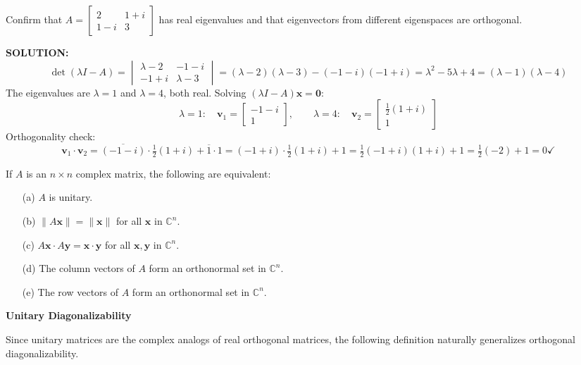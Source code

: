\documentclass{article}
\newcommand{\redheading}[1]{{\vspace{2mm}\noindent\Large\bfseries\color{red!55!black} #1\par}\vspace{2mm}}
\begin{document}
Confirm that
$A = \begin{bmatrix} 2 & 1+i \\ 1-i & 3 \end{bmatrix}$
has real eigenvalues and that eigenvectors from different eigenspaces are orthogonal.

\textbf{SOLUTION:}
\[
  \det(\lambda I - A) = \begin{vmatrix} \lambda-2 & -1-i \\ -1+i & \lambda-3 \end{vmatrix}
  = (\lambda-2)(\lambda-3)-(-1-i)(-1+i) = \lambda^2-5\lambda+4 = (\lambda-1)(\lambda-4)
\]
The eigenvalues are $\lambda=1$ and $\lambda=4$, both real. Solving $(\lambda I-A)\mathbf{x}=\mathbf{0}$:
\[
  \lambda=1:\quad \mathbf{v}_1 = \begin{bmatrix}-1-i\\1\end{bmatrix},
  \qquad
  \lambda=4:\quad \mathbf{v}_2 = \begin{bmatrix}\tfrac{1}{2}(1+i)\\1\end{bmatrix}
\]
Orthogonality check:
\[
  \mathbf{v}_1\cdot\mathbf{v}_2 = \overline{(-1-i)}\cdot\tfrac{1}{2}(1+i) + \overline{1}\cdot 1
  = (-1+i)\cdot\tfrac{1}{2}(1+i)+1 = \tfrac{1}{2}(-1+i)(1+i)+1 = \tfrac{1}{2}(-2)+1 = 0 \checkmark
\]

\begin{tcolorbox}[colback=red!4, colframe=red!60!black,
  title={\textbf{Theorem 7.5.3}}, boxrule=0.5mm, arc=3mm]
If $A$ is an $n\times n$ complex matrix, the following are equivalent:
\begin{enumerate}
  \item[(a)] $A$ is unitary.
  \item[(b)] $\|A\mathbf{x}\|=\|\mathbf{x}\|$ for all $\mathbf{x}$ in $\mathbb{C}^n$.
  \item[(c)] $A\mathbf{x}\cdot A\mathbf{y} = \mathbf{x}\cdot\mathbf{y}$ for all $\mathbf{x},\mathbf{y}$ in $\mathbb{C}^n$.
  \item[(d)] The column vectors of $A$ form an orthonormal set in $\mathbb{C}^n$.
  \item[(e)] The row vectors of $A$ form an orthonormal set in $\mathbb{C}^n$.
\end{enumerate}
\end{tcolorbox}

\redheading{Unitary Diagonalizability}

Since unitary matrices are the complex analogs of real orthogonal matrices, the following definition naturally generalizes orthogonal diagonalizability.
\end{document}
